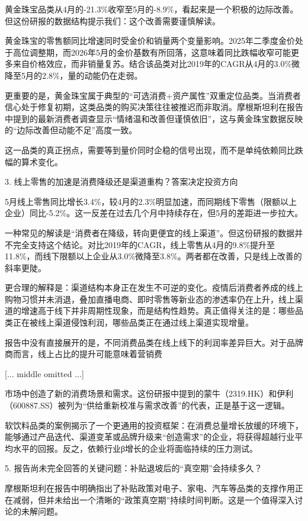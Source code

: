 \documentclass[11pt]{ctexart}
\begin{document}
黄金珠宝品类从4月的-21.3\%收窄至5月的-8.9\%，看起来是一个积极的边际改善。但这份研报的数据结构提示我们：这个改善需要谨慎解读。

黄金珠宝的零售额同比增速同时受金价和销量两个变量影响。2025年二季度金价处于高位调整期，而2026年5月的金价基数有所回落，这意味着同比跌幅收窄可能更多来自价格效应，而非销量复苏。结合该品类对比2019年的CAGR从4月的3.0\%微降至5月的2.8\%，量的动能仍在走弱。

更重要的是，黄金珠宝属于典型的“可选消费+资产属性”双重定位品类。当消费者信心处于修复初期，这类品类的购买决策往往被推迟而非取消。摩根斯坦利在报告中提到的最新消费者调查显示“情绪温和改善但谨慎依旧”，这与黄金珠宝数据反映的“边际改善但动能不足”高度一致。

这一品类的真正拐点，需要等到量价同时企稳的信号出现，而不是单纯依赖同比跌幅的算术变化。

3. 线上零售的加速是消费降级还是渠道重构？答案决定投资方向

5月线上零售同比增长3.4\%，较4月的2.3\%明显加速，而同期线下零售（限额以上企业）同比-5.2\%。这一反差在过去几个月中持续存在，但5月的差距进一步拉大。

一种常见的解读是“消费者在降级，转向更便宜的线上渠道”。但这份研报的数据并不完全支持这个结论。对比2019年的CAGR，线上零售从4月的9.8\%提升至11.8\%，而线下限额以上企业从3.0\%微降至3.8\%。两者都在改善，只是线上改善的斜率更陡。

更合理的解释是：渠道结构本身正在发生不可逆的变化。疫情后消费者养成的线上购物习惯并未消退，叠加直播电商、即时零售等新业态的渗透率仍在上升，线上渠道的增速高于线下并非周期性现象，而是结构性趋势。真正值得关注的是：哪些品类正在被线上渠道侵蚀利润，哪些品类正在通过线上渠道实现增量。

报告中没有直接展开的是，不同消费品类在线上线下的利润率差异巨大。对于品牌商而言，线上占比的提升可能意味着营销费

[... middle omitted ...]

市场中创造了新的消费场景和需求。这份研报中提到的蒙牛（2319.HK）和伊利（600887.SS）被列为“供给重新校准与需求改善”的代表，正是基于这一逻辑。

软饮料品类的案例揭示了一个更通用的投资框架：在消费总量增长放缓的环境下，能够通过产品迭代、渠道变革或品牌升级来“创造需求”的企业，将获得超越行业平均水平的回报。反之，依赖行业β增长的企业将面临持续的压力测试。

5. 报告尚未完全回答的关键问题：补贴退坡后的“真空期”会持续多久？

摩根斯坦利在报告中明确指出了补贴政策对电子、家电、汽车等品类的支撑作用正在减弱，但并未给出一个清晰的“政策真空期”持续时间判断。这是一个值得深入讨论的未解问题。
\end{document}
